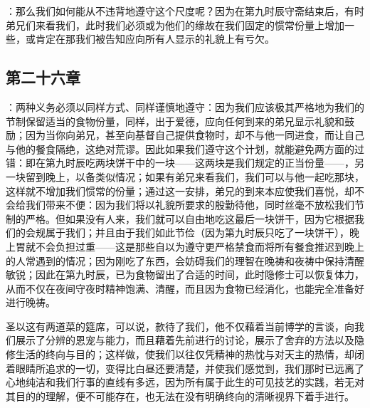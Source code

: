 \par

：那么我们如何能从不违背地遵守这个尺度呢？因为在第九时辰守斋结束后，有时弟兄们来看我们，此时我们必须或为他们的缘故在我们固定的惯常份量上增加一些，或肯定在那我们被告知应向所有人显示的礼貌上有亏欠。\par


\subsection{第二十六章}

\par

：两种义务必须以同样方式、同样谨慎地遵守：因为我们应该极其严格地为我们的节制保留适当的食物份量，同样，出于爱德，应向任何到来的弟兄显示礼貌和鼓励；因为当你向弟兄，甚至向基督自己提供食物时，却不与他一同进食，而让自己与他的餐食隔绝，这绝对荒谬。因此如果我们遵守这个计划，就能避免两方面的过错：即在第九时辰吃两块饼干中的一块——这两块是我们规定的正当份量——，另一块留到晚上，以备类似情况；如果有弟兄来看我们，我们可以与他一起吃那块，这样就不增加我们惯常的份量；通过这一安排，弟兄的到来本应使我们喜悦，却不会给我们带来不便：因为我们将以礼貌所要求的殷勤待他，同时丝毫不放松我们节制的严格。但如果没有人来，我们就可以自由地吃这最后一块饼干，因为它根据我们的会规属于我们；并且由于我们如此节俭（因为第九时辰只吃了一块饼干），晚上胃就不会负担过重——这是那些自以为遵守更严格禁食而将所有餐食推迟到晚上的人常遇到的情况；因为刚吃了东西，会妨碍我们的理智在晚祷和夜祷中保持清醒敏锐；因此在第九时辰，已为食物留出了合适的时间，此时隐修士可以恢复体力，从而不仅在夜间守夜时精神饱满、清醒，而且因为食物已经消化，也能完全准备好进行晚祷。\par

圣以这有两道菜的筵席，可以说，款待了我们，他不仅藉着当前博学的言谈，向我们展示了分辨的恩宠与能力，而且藉着先前进行的讨论，展示了舍弃的方法以及隐修生活的终向与目的；这样做，使我们以往仅凭精神的热忱与对天主的热情，却闭着眼睛所追求的一切，变得比白昼还要清楚，并使我们感觉到，我们那时已远离了心地纯洁和我们行事的直线有多远，因为所有属于此生的可见技艺的实践，若无对其目的的理解，便不可能存在，也无法在没有明确终向的清晰视界下着手进行。\par



